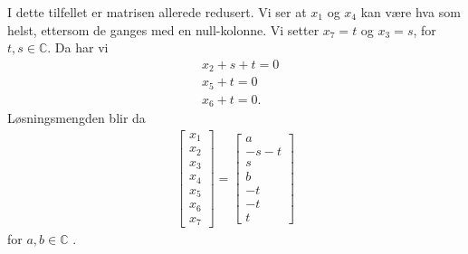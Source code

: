 \documentclass[11pt, a4paper, norsk]{NTNUoving}
\begin{document}
\begin{oppgave}
    \begin{punkt}
        I dette tilfellet er matrisen allerede redusert. Vi ser at $x_1$ og $x_4$ kan være hva som helst, ettersom de ganges med en null-kolonne. Vi setter $x_7=t$ og $x_3=s$, for $t, s \in \mathbb{C}$. Da har vi
        \begin{align*}
            &x_2+s+t = 0\\
            &x_5+t=0\\
            &x_6+t=0.
        \end{align*}
        Løsningsmengden blir da
        \begin{align*}
            \begin{bmatrix}
                x_1\\
                x_2\\
                x_3\\
                x_4\\
                x_5\\
                x_6\\
                x_7
            \end{bmatrix}=
            \begin{bmatrix}
                a\\
                -s-t\\
                s\\
                b\\
                -t\\
                -t\\
                t
            \end{bmatrix}
        \end{align*}
        for $a, b \in \mathbb{C}$ .
    \end{punkt}
    

\end{oppgave}
\end{document}

